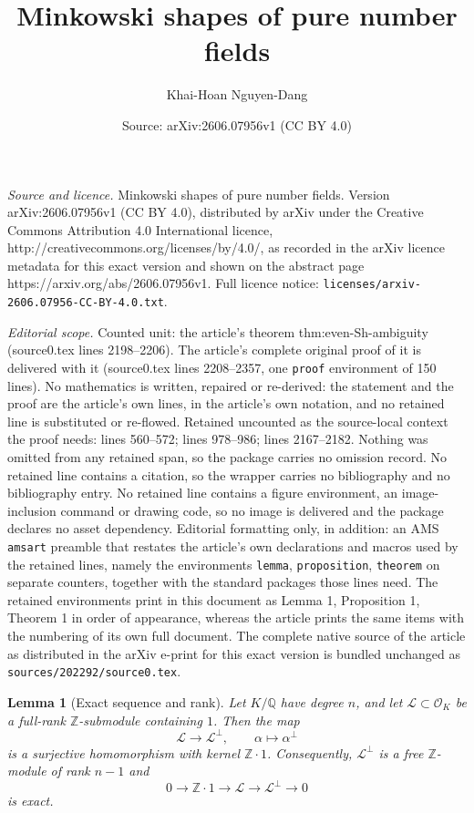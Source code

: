 \documentclass[10pt,a4paper]{amsart}
\title{Minkowski shapes of pure number fields}
\author{Khai-Hoan Nguyen-Dang}
\date{Source: arXiv:2606.07956v1 (CC BY 4.0)}
\newtheorem{lemma}{Lemma}
\newcommand{\Q}{\mathbb{Q}}
\newcommand{\Z}{\mathbb{Z}}
\newcommand{\cO}{\mathcal{O}}
\begin{document}
\maketitle

\noindent\emph{Source and licence.} Minkowski shapes of pure number fields. Version arXiv:2606.07956v1 (CC BY 4.0), distributed by arXiv under the Creative Commons Attribution 4.0 International licence, http://creativecommons.org/licenses/by/4.0/, as recorded in the arXiv licence metadata for this exact version and shown on the abstract page https://arxiv.org/abs/2606.07956v1. Full licence notice: \texttt{licenses/arxiv-2606.07956-CC-BY-4.0.txt}.\par\smallskip

\noindent\textit{Editorial scope.} Counted unit: the article's theorem thm:even-Sh-ambiguity (source0.tex lines 2198--2206). The article's complete original proof of it is delivered with it (source0.tex lines 2208--2357, one \texttt{proof} environment of 150 lines). No mathematics is written, repaired or re-derived: the statement and the proof are the article's own lines, in the article's own notation, and no retained line is substituted or re-flowed.  Retained uncounted as the source-local context the proof needs: lines 560--572; lines 978--986; lines 2167--2182.  Nothing was omitted from any retained span, so the package carries no omission record.  No retained line contains a citation, so the wrapper carries no bibliography and no bibliography entry.  No retained line contains a figure environment, an image-inclusion command or drawing code, so no image is delivered and the package declares no asset dependency.  Editorial formatting only, in addition: an AMS \texttt{amsart} preamble that restates the article's own declarations and macros used by the retained lines, namely the environments \texttt{lemma}, \texttt{proposition}, \texttt{theorem} on separate counters, together with the standard packages those lines need.  The retained environments print in this document as Lemma 1, Proposition 1, Theorem 1 in order of appearance, whereas the article prints the same items with the numbering of its own full document.  The complete native source of the article as distributed in the arXiv e-print for this exact version is bundled unchanged as \texttt{sources/202292/source0.tex}.
\begin{lemma}[Exact sequence and rank]\label{lem:exact-sequence}
Let $K/\Q$ have degree $n$, and let $\mathcal L\subset \cO_K$ be a full-rank $\Z$-submodule containing $1$.
Then the map
\[
\mathcal L\longrightarrow \mathcal L^\perp,\qquad \alpha\longmapsto \alpha^\perp
\]
is a surjective homomorphism with kernel $\Z\cdot 1$.
Consequently, $\mathcal L^\perp$ is a free $\Z$-module of rank $n-1$ and
\[
0\longrightarrow \Z\cdot 1\longrightarrow \mathcal L\longrightarrow \mathcal L^\perp\longrightarrow 0
\]
is exact.
\end{lemma}
\end{document}
